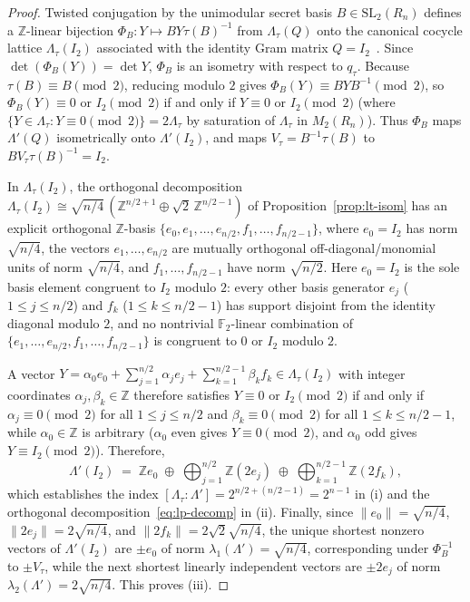 \documentclass[11pt,a4paper]{article}
\theoremstyle{definition}
\newcommand{\Z}{\mathbb{Z}}
\newcommand{\F}{\mathbb{F}}
\newcommand{\Lt}{\Lambda_\tau}
\newcommand{\Lp}{\Lambda'}
\newcommand{\Vt}{V_\tau}
\begin{document}
\begin{proof}
Twisted conjugation by the unimodular secret basis $B \in \mathrm{SL}_2(R_n)$ defines a $\Z$-linear bijection $\Phi_B: Y \mapsto B Y \tau(B)^{-1}$ from $\Lt(Q)$ onto the canonical cocycle lattice $\Lt(I_2)$ associated with the identity Gram matrix $Q = I_2$~\cite[Proposition~4.5]{SW26}. Since $\det(\Phi_B(Y)) = \det Y$, $\Phi_B$ is an isometry with respect to $q_\tau$. Because $\tau(B) \equiv B \pmod 2$, reducing modulo $2$ gives $\Phi_B(Y) \equiv B Y B^{-1} \pmod 2$, so $\Phi_B(Y) \equiv 0 \text{ or } I_2 \pmod 2$ if and only if $Y \equiv 0 \text{ or } I_2 \pmod 2$ (where $\{Y\in\Lt : Y\equiv 0\pmod 2\} = 2\Lt$ by saturation of $\Lt$ in $M_2(R_n)$). Thus $\Phi_B$ maps $\Lp(Q)$ isometrically onto $\Lp(I_2)$, and maps $\Vt = B^{-1}\tau(B)$ to $B \Vt \tau(B)^{-1} = I_2$.

In $\Lt(I_2)$, the orthogonal decomposition $\Lt(I_2) \cong \sqrt{n/4}\,(\Z^{n/2+1} \oplus \sqrt{2}\,\Z^{n/2-1})$ of Proposition~\ref{prop:lt-isom} has an explicit orthogonal $\Z$-basis $\{e_0, e_1, \dots, e_{n/2}, f_1, \dots, f_{n/2-1}\}$, where $e_0 = I_2$ has norm $\sqrt{n/4}$, the vectors $e_1, \dots, e_{n/2}$ are mutually orthogonal off-diagonal/monomial units of norm $\sqrt{n/4}$, and $f_1, \dots, f_{n/2-1}$ have norm $\sqrt{n/2}$. Here $e_0 = I_2$ is the sole basis element congruent to $I_2$ modulo $2$: every other basis generator $e_j$ ($1 \le j \le n/2$) and $f_k$ ($1 \le k \le n/2-1$) has support disjoint from the identity diagonal modulo $2$, and no nontrivial $\F_2$-linear combination of $\{e_1, \dots, e_{n/2}, f_1, \dots, f_{n/2-1}\}$ is congruent to $0$ or $I_2$ modulo $2$.

A vector $Y = \alpha_0 e_0 + \sum_{j=1}^{n/2} \alpha_j e_j + \sum_{k=1}^{n/2-1} \beta_k f_k \in \Lt(I_2)$ with integer coordinates $\alpha_j, \beta_k \in \Z$ therefore satisfies $Y \equiv 0 \text{ or } I_2 \pmod 2$ if and only if $\alpha_j \equiv 0 \pmod 2$ for all $1 \le j \le n/2$ and $\beta_k \equiv 0 \pmod 2$ for all $1 \le k \le n/2-1$, while $\alpha_0 \in \Z$ is arbitrary ($\alpha_0$ even gives $Y \equiv 0 \pmod 2$, and $\alpha_0$ odd gives $Y \equiv I_2 \pmod 2$). Therefore,
\[
  \Lp(I_2) \;=\; \Z e_0 \;\oplus\; \bigoplus_{j=1}^{n/2} \Z(2e_j) \;\oplus\; \bigoplus_{k=1}^{n/2-1} \Z(2f_k),
\]
which establishes the index $[\Lt : \Lp] = 2^{n/2 + (n/2 - 1)} = 2^{n-1}$ in (i) and the orthogonal decomposition~\eqref{eq:lp-decomp} in (ii). Finally, since $\|e_0\| = \sqrt{n/4}$, $\|2e_j\| = 2\sqrt{n/4}$, and $\|2f_k\| = 2\sqrt{2}\sqrt{n/4}$, the unique shortest nonzero vectors of $\Lp(I_2)$ are $\pm e_0$ of norm $\lambda_1(\Lp) = \sqrt{n/4}$, corresponding under $\Phi_B^{-1}$ to $\pm \Vt$, while the next shortest linearly independent vectors are $\pm 2e_j$ of norm $\lambda_2(\Lp) = 2\sqrt{n/4}$. This proves (iii).
\end{proof}
\end{document}
